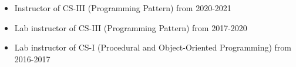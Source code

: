 \documentclass{res}
\begin{document}
\begin{resume}
\begin{center}
	\begin{itemize}
		\item Instructor of CS-III (Programming Pattern) from 2020-2021
		\item Lab instructor of CS-III (Programming Pattern) from 2017-2020
		\item Lab instructor of CS-I (Procedural and Object-Oriented Programming) from 2016-2017
	\end{itemize} 
\end{center}
 
  
\end{resume} 
\end{document}
